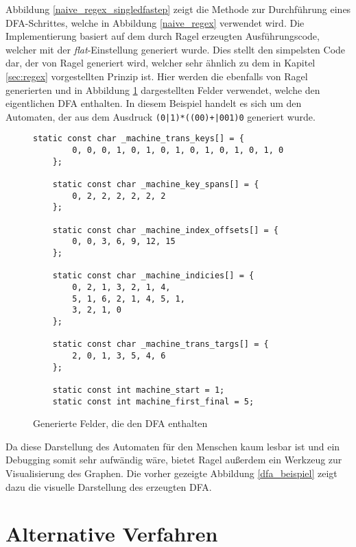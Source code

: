  Abbildung \ref{naive_regex_singledfastep} zeigt die Methode zur Durchführung eines DFA-Schrittes, welche in Abbildung \ref{naive_regex} verwendet wird.
 Die Implementierung basiert auf dem durch Ragel erzeugten Ausführungscode, welcher mit der \emph{flat}-Einstellung generiert wurde.
 Dies stellt den simpelsten Code dar, der von Ragel generiert wird, welcher sehr ähnlich zu dem in Kapitel \ref{sec:regex} vorgestellten Prinzip ist.
 Hier werden die ebenfalls von Ragel generierten und in Abbildung \ref{naive_regex_felder} dargestellten Felder verwendet, welche den eigentlichen DFA enthalten.
 In diesem Beispiel handelt es sich um den Automaten, der aus dem Ausdruck \texttt{(0|1)*((00)+|001)0} generiert wurde.
 
 \begin{figure}[]
	 \begin{lstlisting}[language=MyC++]
	static const char _machine_trans_keys[] = {
		0, 0, 0, 1, 0, 1, 0, 1, 0, 1, 0, 1, 0, 1, 0
	};
	
	static const char _machine_key_spans[] = {
		0, 2, 2, 2, 2, 2, 2
	};
	
	static const char _machine_index_offsets[] = {
		0, 0, 3, 6, 9, 12, 15
	};
	
	static const char _machine_indicies[] = {
		0, 2, 1, 3, 2, 1, 4, 
		5, 1, 6, 2, 1, 4, 5, 1, 
		3, 2, 1, 0
	};
	
	static const char _machine_trans_targs[] = {
		2, 0, 1, 3, 5, 4, 6
	};
	
	static const int machine_start = 1;
	static const int machine_first_final = 5;
	\end{lstlisting}
	\caption{Generierte Felder, die den DFA enthalten}
	\label{naive_regex_felder}
\end{figure}
 
Da diese Darstellung des Automaten für den Menschen kaum lesbar ist und ein Debugging somit sehr aufwändig wäre, bietet Ragel außerdem ein Werkzeug zur Visualisierung des Graphen.
Die vorher gezeigte Abbildung \ref{dfa_beispiel} zeigt dazu die visuelle Darstellung des erzeugten DFA.

\section{Alternative Verfahren}
\label{sec:regex_alternativen}

